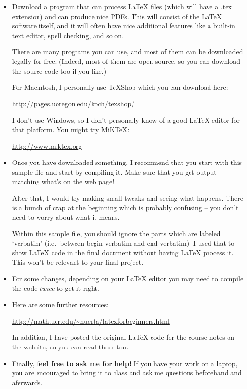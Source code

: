 \documentclass[12pt, leqno]{article}
\newcommand{\urlc}[1]{\begin{center} \url{#1} \end{center}}
\begin{document}
\begin{itemize}
\item Download a program that can process LaTeX files (which will have a .tex extension) and can produce nice PDFs. This will
consist of the LaTeX software itself, and it will often have nice additional features like a built-in text editor, spell checking, and so on.

There are many programs you can use, and most of them can be downloaded legally for free. (Indeed, most of them are
open-source, so you can download the source code too if you like.)

For Macintosh, I personally use TeXShop which you can download here:
\urlc{http://pages.uoregon.edu/koch/texshop/}

I don't use Windows, so I don't personally know of a good LaTeX editor for that platform. You might try MiKTeX:
\urlc{http://www.miktex.org}

\item
Once you have downloaded something, I recommend that you start with this sample file and start by compiling it. Make sure that
you get output matching what's on the web page!

After that, I would try making small tweaks and seeing what happens. There is a bunch of crap at the beginning which is probably
confusing -- you don't need to worry about what it means.

Within this sample file, you should ignore the parts which are labeled `verbatim' (i.e., between begin verbatim and end verbatim). I used that
to show LaTeX code in the final document without having LaTeX process it. This won't be relevant to your final project.

\item
For some changes, depending on your LaTeX editor you may need to compile the code {\itshape twice} to get it right.

\item
Here are some further resources:

\urlc{http://math.ucr.edu/~huerta/latexforbeginners.html}

In addition, I have posted the original LaTeX code for the course notes on the website, so you can read those too.

\item
Finally, {\bf feel free to ask me for help!} If you have your work on a laptop, you are encouraged to bring it to class and ask me questions
beforehand and aferwards.

\end{itemize}
\end{document}
